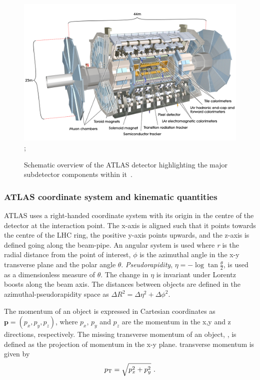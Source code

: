 \begin{figure}
    \centering
    \includegraphics[width=\textwidth]{images/ATLAS.png};
    \caption[Schematic of the ATLAS detector]{Schematic overview of the ATLAS detector highlighting the major subdetector components within it~\cite{ATLASImage}.}
    \label{fig:method:ATLAS}
\end{figure}

\subsubsection{ATLAS coordinate system and kinematic quantities}

ATLAS uses a right-handed coordinate system with its origin in the centre of the detector at the interaction point. The x-axis is aligned such that it points towards the centre of the LHC ring, the positive y-axis points upwards, and the z-axis is defined going along the beam-pipe. An angular system is used where \emph{r} is the radial distance from the point of interest, \emph{$\phi$} is the azimuthal angle in the x-y transverse plane and the polar angle \emph{$\theta$}. \emph{Pseudorapidity}, $\eta = -\log\tan\frac{\theta}{2}$, is used as a dimensionless measure of \emph{$\theta$}. The change in \emph{$\eta$} is invariant under Lorentz boosts along the beam axis. The distances between objects are defined in the azimuthal-pseudorapidity  space as $\Delta R^2 = \Delta \eta^2 + \Delta \phi^2$. 

The momentum of an object is expressed in Cartesian coordinates as $\textbf{p} = (p_x,p_y,p_z)$, where $p_x$, $p_y$ and $p_z$ are the momentum in the x,y and z directions, respectively. The missing transverse momentum of an object, \pt, is defined as the projection of momentum in the x-y plane. transverse momentum is given by
\begin{equation}
    p_{\text{T}} = \sqrt{ p_{x}^{2} + p_{y}^{2}}~.
\end{equation}

